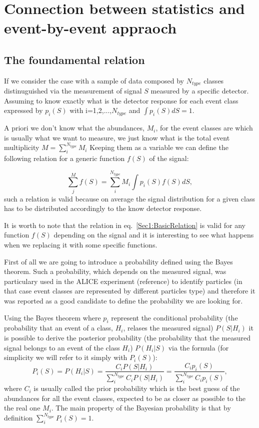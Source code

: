 \section{Connection between statistics and event-by-event appraoch}
\subsection{The foundamental relation}
If we consider the case with a sample of data composed by $N_{type}$ classes distinuguished via the measurement of signal $S$ measured by a specific detector.
Assuming to know exactly what is the detector response for each event class expressed by $p_{i}(S)$ with i=1,2,...,$N_{type}$ and $\int p_{i}(S) dS = 1$.

A priori we don't know what the abundances, $M_{i}$, for the event classes are which is usually what we want to measure, we just know what is the total event multiplicity $M = \sum\limits_{i}^{N_{type}} M_{i}$ 
Keeping them as a variable we can define the following relation for a generic function $f(S)$ of the signal:

\begin{equation}
\label{Sec1:BasicRelation}
\sum\limits_{j}^{M} f(S) = \sum\limits_{i}^{N_{type}} M_{i} \int p_{i}(S) f(S) dS,
\end{equation}
such a relation is valid because on average the signal distribution for a given class has to be distributed accordingly to the know detector response.

It is worth to note that the relation in eq.~\ref{Sec1:BasicRelation} is valid for any function $f(S)$ depending on the signal and it is interesting to see what happens when we replacing it with some specific functions.

First of all we are going to introduce a probability defined using the Bayes theorem. Such a probability, which depends on the measured signal, was particulary used in the ALICE experiment (reference) to identify particles (in that case event classes are represented by different particles type) and therefore it was reported as a good candidate to define the probability we are looking for.

Using the Bayes theorem where $p_{i}$ represent the conditional probability (the probability that an event of a class, $H_{i}$, relases the measured signal) $P(S|H_{i})$ it is possible to derive the posterior probability (the probability that the measured signal belongs to an event of the class $H_{i}$) $P(H_{i}|S)$ via the formula (for simplicity we will refer to it simply with $P_{i}(S)$):
\begin{equation}
\label{Sec1:BayesianProb}
P_{i}(S) = P(H_{i}|S) = \frac{C_{i} P(S|H_{i})}{\sum\limits_{i}^{N_{type}}C_{i} P(S|H_{i})} = \frac{C_{i} p_{i}(S)}{\sum\limits_{i}^{N_{type}}C_{i} p_{i}(S)},
\end{equation}
where $C_{i}$ is usually called the prior probability which is the best guess of the abundances for all the event classes, expected to be as closer as possible to the the real one $M_{i}$. The main property of the Bayesian probability is that by definition $\sum\limits_{i}^{N_{type}} P_{i}(S) = 1$.

